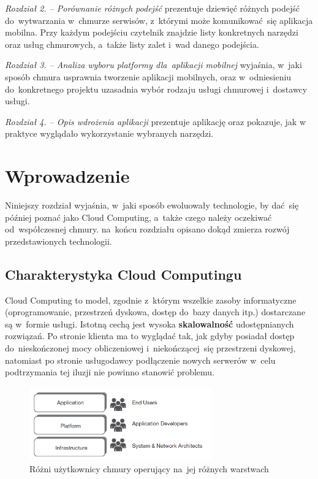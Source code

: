 \documentclass[12pt,a4paper,twoside,titlepage,openright]{book}
\begin{document}
\noindent
\textit{Rozdział 2. -- Porównanie różnych podejść} prezentuje dziewięć różnych podejść do~wytwarzania w~chmurze serwisów, z~którymi może komunikować~się aplikacja mobilna. Przy każdym podejściu czytelnik znajdzie listy konkretnych narzędzi oraz usług chmurowych, a~także listy zalet i~wad danego podejścia.

\noindent
\textit{Rozdział 3. -- Analiza wyboru platformy dla~aplikacji mobilnej} wyjaśnia, w~jaki sposób chmura usprawnia tworzenie aplikacji mobilnych, oraz w~odniesieniu do~konkretnego projektu uzasadnia wybór rodzaju usługi chmurowej i~dostawcy usługi.

\noindent
\textit{Rozdział 4. -- Opis wdrożenia aplikacji} prezentuje aplikację oraz pokazuje, jak w praktyce wyglądało wykorzystanie wybranych narzędzi.


\clearpage{\pagestyle{empty}\cleardoublepage}
\chapter{Wprowadzenie}

Niniejszy rozdział wyjaśnia, w~jaki sposób ewoluowały technologie, by dać~się później poznać jako Cloud Computing, a~także czego należy oczekiwać od~współczesnej chmury. na~końcu rozdziału opisano dokąd zmierza rozwój przedstawionych technologii.



\section{Charakterystyka Cloud Computingu}

Cloud Computing to model, zgodnie z~którym wszelkie zasoby informatyczne (oprogramowanie, przestrzeń dyskowa, dostęp do~bazy danych itp.) dostarczane są w~formie usługi. Istotną cechą jest wysoka \textbf{skalowalność} udostępnianych rozwiązań. Po stronie klienta ma to wyglądać tak, jak gdyby posiadał dostęp do~nieskończonej mocy obliczeniowej i~niekończącej~się przestrzeni dyskowej, natomiast po stronie usługodawcy podłączenie nowych serwerów w~celu podtrzymania tej iluzji nie powinno stanowić problemu. \cite{ccBiznes}

\begin{figure}[h]
	\centering
			\includegraphics[width=0.7\textwidth]{layers-and-users.png}
		\caption{Różni użytkownicy chmury operujący na~jej różnych warstwach \cite{ccCambridge}}
		\label{fig:layers-and-users}
\end{figure}
\end{document}
